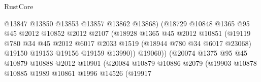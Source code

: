\begin{lexlean}{RustCore}
\begin{coremodule}
                                        @13847
                                        @13850
                                        @13853
                                        @13857
                                        @13862
                                        @13868)
                                      (@18729
                                        @10848
                                        @1365
                                        @95
                                        @45
                                        @2012
                                        @10852
                                        @2012
                                        @2107
                                        (@18928
                                          @1365
                                          @45
                                          @2012
                                          @10851
                                          (@19119
                                            @780
                                            @34
                                            @45
                                            @2012
                                            @6017
                                            @2033
                                            @1519
                                            (@18944 @780 @34 @6017 @23068)
                                            @19150
                                            @19153
                                            @19156
                                            @19159
                                            @13990))
                                        @19060))
                                    (@20074
                                      @1375
                                      @95
                                      @45
                                      @10879
                                      @10888
                                      @2012
                                      @10901
                                      (@20084
                                        @10879
                                        @10886
                                        @2079
                                        (@19903
                                          @10878
                                          @10885
                                          @1989
                                          @10861
                                          @1996
                                          @14526
                                          (@19917

\end{coremodule}
\end{lexlean}
